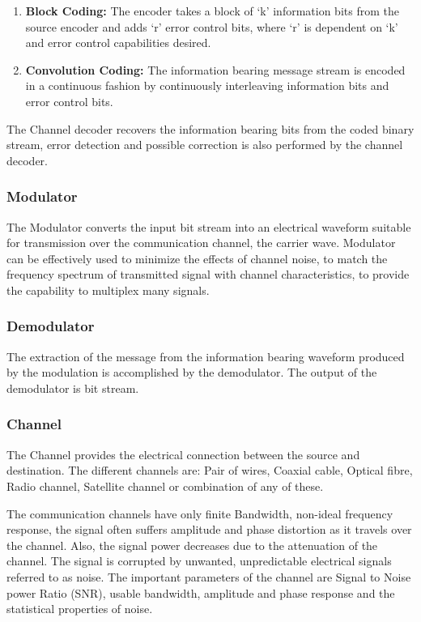 \begin{enumerate}

  \item \textbf{Block Coding:} The encoder takes a block of ‘k’ information bits
  from the source encoder and adds ‘r’ error control bits, where ‘r’ is dependent
  on ‘k’ and error control capabilities desired.

  \item \textbf{Convolution Coding:} The information bearing message stream is
  encoded in a continuous fashion by continuously interleaving information bits
  and error control bits.

\end{enumerate}


The Channel decoder recovers the information bearing bits from the coded binary
stream, error detection and possible correction is also performed by the channel
decoder.

\subsubsection{Modulator}

The Modulator converts the input bit stream into an electrical waveform suitable
for transmission over the communication channel, the carrier wave. Modulator can
be effectively used to minimize the effects of channel noise, to match the
frequency spectrum of transmitted signal with channel characteristics, to
provide the capability to multiplex many signals.

\subsubsection{Demodulator}

The extraction of the message from the information bearing waveform produced by
the modulation is accomplished by the demodulator. The output of the demodulator
is bit stream.

\subsubsection{Channel}

The Channel provides the electrical connection between the source and
destination. The different channels are: Pair of wires, Coaxial cable, Optical
fibre, Radio channel, Satellite channel or combination of any of these.

The communication channels have only finite Bandwidth, non-ideal frequency
response, the signal often suffers amplitude and phase distortion as it travels
over the channel. Also, the signal power decreases due to the attenuation of the
channel. The signal is corrupted by unwanted, unpredictable electrical signals
referred to as noise. The important parameters of the channel are Signal to
Noise power Ratio (SNR), usable bandwidth, amplitude and phase response and the
statistical properties of noise.

